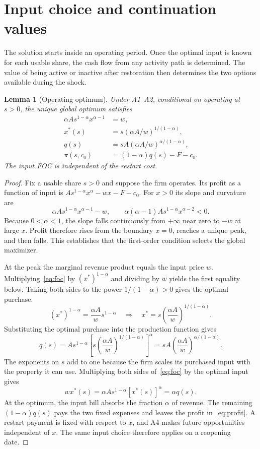 \documentclass[11pt,letterpaper]{article}
\newtheorem{lemma}{Lemma}
\begin{document}
\section{Input choice and continuation values}\label{sec:values}
The solution starts inside an operating period. Once the optimal input is known for each usable share, the cash flow from any activity path is determined. The value of being active or inactive after restoration then determines the two options available during the shock.

\begin{lemma}[Operating optimum]\label{lem:input}
Under A1--A2, conditional on operating at $s>0$, the unique global optimum satisfies
\begin{align}
\alpha As^{1-\alpha}x^{\alpha-1}&=w,\label{eq:foc}\\
x^*(s)&=s(\alpha A/w)^{1/(1-\alpha)},\\
q(s)&=sA(\alpha A/w)^{\alpha/(1-\alpha)},\\
\pi(s,c_0)&=(1-\alpha)q(s)-F-c_0.\label{eq:profit}
\end{align}
The input FOC is independent of the restart cost.
\end{lemma}
\begin{proof}
Fix a usable share $s>0$ and suppose the firm operates. Its profit as a function of input is $As^{1-\alpha}x^\alpha-wx-F-c_0$. For $x>0$ its slope and curvature are
\[
 \alpha As^{1-\alpha}x^{\alpha-1}-w,\qquad
 \alpha(\alpha-1)As^{1-\alpha}x^{\alpha-2}<0.
\]
Because $0<\alpha<1$, the slope falls continuously from $+\infty$ near zero to $-w$ at large $x$. Profit therefore rises from the boundary $x=0$, reaches a unique peak, and then falls. This establishes that the first-order condition selects the global maximizer.

At the peak the marginal revenue product equals the input price $w$. Multiplying~\eqref{eq:foc} by $(x^*)^{1-\alpha}$ and dividing by $w$ yields the first equality below. Taking both sides to the power $1/(1-\alpha)>0$ gives the optimal purchase.
\[
 (x^*)^{1-\alpha}=\frac{\alpha A}{w}s^{1-\alpha}
 \quad\Longrightarrow\quad
 x^*=s\left(\frac{\alpha A}{w}\right)^{1/(1-\alpha)} .
\]
Substituting the optimal purchase into the production function gives
\[
 q(s)=A s^{1-\alpha}
        \left[s\left(\frac{\alpha A}{w}\right)^{1/(1-\alpha)}\right]^\alpha
      =s A\left(\frac{\alpha A}{w}\right)^{\alpha/(1-\alpha)} .
\]
The exponents on $s$ add to one because the firm scales its purchased input with the property it can use. Multiplying both sides of~\eqref{eq:foc} by the optimal input gives
\[
 w x^*(s)=\alpha A s^{1-\alpha}[x^*(s)]^\alpha=\alpha q(s).
\]
At the optimum, the input bill absorbs the fraction $\alpha$ of revenue. The remaining $(1-\alpha)q(s)$ pays the two fixed expenses and leaves the profit in~\eqref{eq:profit}. A restart payment is fixed with respect to $x$, and A4 makes future opportunities independent of $x$. The same input choice therefore applies on a reopening date.
\end{proof}
\end{document}
